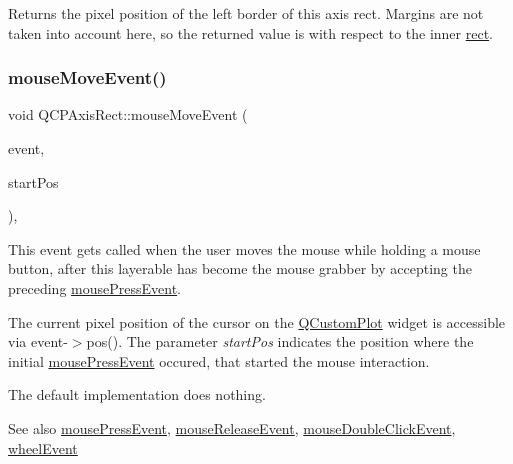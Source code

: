 Returns the pixel position of the left border of this axis rect. Margins are not taken into account here, so the returned value is with respect to the inner \hyperlink{class_q_c_p_layout_element_a208effccfe2cca4a0eaf9393e60f2dd4}{rect}. \mbox{\label{class_q_c_p_axis_rect_a9cd27ad8c5cfb49aefd9dbb30def4beb}} 
\subsubsection{\texorpdfstring{mouse\+Move\+Event()}{mouseMoveEvent()}\hspace{0.1cm}{\footnotesize\ttfamily [1/2]}}
{\footnotesize\ttfamily void Q\+C\+P\+Axis\+Rect\+::mouse\+Move\+Event (\begin{DoxyParamCaption}\item[{Q\+Mouse\+Event $\ast$}]{event,  }\item[{const Q\+PointF \&}]{start\+Pos }\end{DoxyParamCaption})\hspace{0.3cm}{\ttfamily [protected]}, {\ttfamily [virtual]}}

This event gets called when the user moves the mouse while holding a mouse button, after this layerable has become the mouse grabber by accepting the preceding \hyperlink{class_q_c_p_axis_rect_aa9a7c807eaa4666870ac94aa6abc4dde}{mouse\+Press\+Event}.

The current pixel position of the cursor on the \hyperlink{class_q_custom_plot}{Q\+Custom\+Plot} widget is accessible via {\ttfamily event-\/$>$pos()}. The parameter {\itshape start\+Pos} indicates the position where the initial \hyperlink{class_q_c_p_axis_rect_aa9a7c807eaa4666870ac94aa6abc4dde}{mouse\+Press\+Event} occured, that started the mouse interaction.

The default implementation does nothing.

\begin{DoxySeeAlso}{See also}
\hyperlink{class_q_c_p_axis_rect_aa9a7c807eaa4666870ac94aa6abc4dde}{mouse\+Press\+Event}, \hyperlink{class_q_c_p_axis_rect_a6c89b988d3a0b93c0878f0ebdb5037f4}{mouse\+Release\+Event}, \hyperlink{class_q_c_p_layerable_a4171e2e823aca242dd0279f00ed2de81}{mouse\+Double\+Click\+Event}, \hyperlink{class_q_c_p_axis_rect_a93eeaa0c127d6d6fe8171b2455080262}{wheel\+Event} 
\end{DoxySeeAlso}


